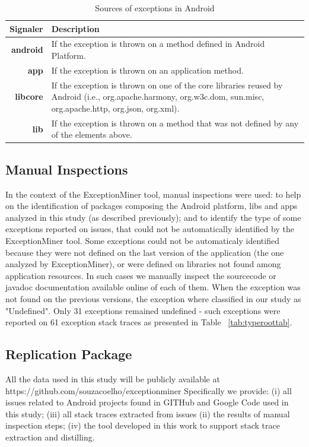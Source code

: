 \documentclass[conference]{IEEEtran}
\begin{document}

\begin{table}
  \centering
  \begin{tabular}{rp{29em}}
    \hline
    \bfseries{Signaler} & \bfseries{Description} \\
    \hline
    \bfseries{android} & If the exception is thrown on a method defined in Android Platform.\\
    \bfseries{app}     & If the exception is thrown on an application method.\\
    \bfseries{libcore} & If the exception is thrown on one of the core libraries reused by Android (i.e., org.apache.harmony, org.w3c.dom, sun.misc, org.apache.http, org.json, org.xml). \\
    \bfseries{lib}     & If the exception is thrown on a method that was not defined by any of the elements above.\\
    \hline
  \end{tabular}
  \caption{Sources of exceptions in Android}
  \label{tab:signalers}
\end{table}

\subsection{Manual Inspections}
In the context of the ExceptionMiner tool, manual inspections were used:
to help on the identification of packages composing the Android platform, 
libs and apps analyzed in this study (as described previously); and to 
identify the type of some exceptions reported on issues, 
that could not be automatically identified by the ExceptionMiner tool.
Some exceptions could not be automaticaly identified because they were 
not defined on the last version of the application (the one analyzed by ExceptionMiner),
or were defined on libraries not found among application resources.
In such cases we manually inspect the sourcecode or javadoc
 documentation available online of each of them. 
When the exception was not found on the previous versions, the exception where classified 
in our study as "Undefined".  Only 31 exceptions 
remained undefined - such exceptions were reported on 61 exception stack traces as 
presented in Table ~\ref{tab:typeroottab}.

\subsection{Replication Package}
All the data used in this study will be publicly available at https://github.com/souzacoelho/exceptionminer
Specifically we provide: (i) all issues related to Android projects found
in GITHub and Google Code used in this study; (iii) all stack traces extracted
from issues (ii) the results of manual inspection steps; (iv) the tool developed 
in this work to support stack trace extraction and distilling.
\end{document}
